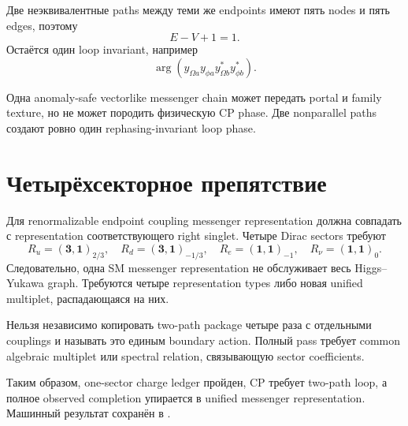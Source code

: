 Две неэквивалентные paths между теми же endpoints имеют пять nodes и пять
edges, поэтому
\begin{equation}
E-V+1=1.
\end{equation}
Остаётся один loop invariant, например
\begin{equation}
\arg\left(
y_{\Omega a}y_{\phi a}
y_{\Omega b}^*y_{\phi b}^*
\right).
\end{equation}

\begin{theorem}
Одна anomaly-safe vectorlike messenger chain может передать portal и family
texture, но не может породить физическую CP phase. Две nonparallel paths
создают ровно один rephasing-invariant loop phase.
\end{theorem}

\section{Четырёхсекторное препятствие}

Для renormalizable endpoint coupling messenger representation должна
совпадать с representation соответствующего right singlet. Четыре Dirac
sectors требуют
\begin{equation}
R_u=(\mathbf3,\mathbf1)_{2/3},
\quad
R_d=(\mathbf3,\mathbf1)_{-1/3},
\quad
R_e=(\mathbf1,\mathbf1)_{-1},
\quad
R_\nu=(\mathbf1,\mathbf1)_0.
\end{equation}
Следовательно, одна SM messenger representation не обслуживает весь
Higgs--Yukawa graph. Требуются четыре representation types либо новая unified
multiplet, распадающаяся на них.

\begin{nogocriterion}
Нельзя независимо копировать two-path package четыре раза с отдельными
couplings и называть это единым boundary action. Полный pass требует common
algebraic multiplet или spectral relation, связывающую sector coefficients.
\end{nogocriterion}

Таким образом, one-sector charge ledger пройден, CP требует two-path loop, а
полное observed completion упирается в unified messenger representation.
Машинный результат сохранён в
.